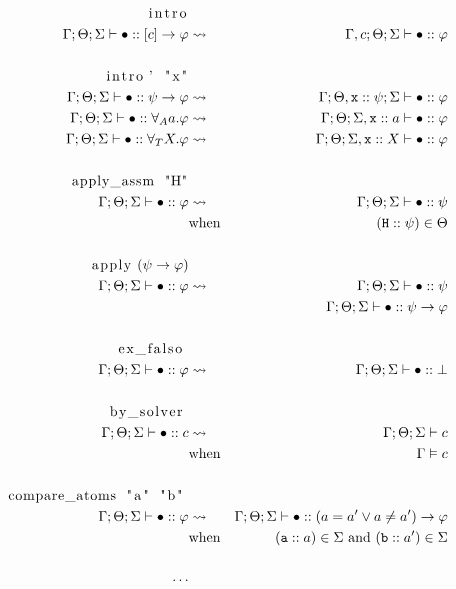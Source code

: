 \documentclass[english, mgr]{iithesis}
\begin{document}
\begin{eqnarray*}
  \text{\lstinline[columns=fixed]{intro}} & & \\
    \jgmnt[\Gamma; \Theta; \Sigma]{\hole\ofkind{\fCImp{\constr}{\formphi}}} & \leadsto & \jgmnt[\Gamma, \constr; \Theta; \Sigma]{\hole\ofkind\formphi} \\
  & & \\
  \text{\lstinline[columns=fixed]{intro' "x"}} & & \\
  \jgmnt[\Gamma; \Theta; \Sigma]{\hole\ofkind{\psi\fImp\formphi}} & \leadsto & \jgmnt[\Gamma; \Theta, \texttt{x} \ofkind\psi ; \Sigma]{\hole\ofkind\formphi} \\
  \jgmnt[\Gamma; \Theta; \Sigma]{\hole\ofkind{\fForallAtom{\atomv}{\formphi}}} & \leadsto & \jgmnt[\Gamma; \Theta; \Sigma, \texttt{x} \ofkind\atomv]{\hole\ofkind\formphi} \\
  \jgmnt[\Gamma; \Theta; \Sigma]{\hole\ofkind{\fForallTerm{\termv}{\formphi}}} & \leadsto & \jgmnt[\Gamma; \Theta; \Sigma, \texttt{x} \ofkind\termv]{\hole\ofkind\formphi} \\
  & & \\
  \text{\lstinline[columns=fixed]{apply_assm "H"}} & & \\
    \jgmnt[\Gamma; \Theta; \Sigma]{\hole\ofkind{{\formphi}}} & \leadsto & \jgmnt[\Gamma; \Theta; \Sigma]{\hole\ofkind\psi} \\
   & \text{when} & (\texttt{H} \ofkind \psi) \in \Theta \\
  & & \\
  \text{\lstinline[columns=fixed]{apply} } (\psi \fImp \formphi)& & \\
  \jgmnt[\Gamma; \Theta; \Sigma]{\hole\ofkind{{\formphi}}} & \leadsto & \jgmnt[\Gamma; \Theta; \Sigma]{\hole\ofkind\psi} \\
  &          & \jgmnt[\Gamma; \Theta; \Sigma]{\hole\ofkind\psi \fImp \formphi} \\
  & & \\
  \text{\lstinline[columns=fixed]{ex_falso} } & & \\
  \jgmnt[\Gamma; \Theta; \Sigma]{\hole\ofkind{{\formphi}}} & \leadsto & \jgmnt[\Gamma; \Theta; \Sigma]{\hole\ofkind\bot} \\
  & & \\
  \text{\lstinline[columns=fixed]{by_solver} }& & \\
  \jgmnt[\Gamma; \Theta; \Sigma]{\hole\ofkind{{\constr}}} & \leadsto & \jgmnt[\Gamma; \Theta; \Sigma]{\constr} \\
   & \text{when} & \cjgmnt[\Gamma]{\constr}\\
  & & \\
  \text{\lstinline[columns=fixed]{compare_atoms "a" "b"} }& & \\
  \jgmnt[\Gamma; \Theta; \Sigma]{\hole\ofkind{{\formphi}}} & \leadsto & \jgmnt[\Gamma; \Theta; \Sigma]{\hole\ofkind{(\atomv \ceq \atomv'\vee\atomv \cneq \atomv')\fImp{\formphi}}} \\
   & \text{when} & (\texttt{a} \ofkind \atomv) \in \Sigma \text{ and } (\texttt{b} \ofkind \atomv') \in \Sigma\\
   \\ \cdots
\end{eqnarray*}
\end{document}
